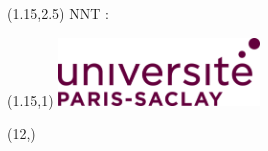 \label{cotutelle}






\begin{textblock}{13}(1.15,2.5)
  NNT : \NNT
\end{textblock}


\begin{textblock}{1}(1.15,1)
\includegraphics[height=1.8cm]{Figures/Logos/UPSac.png} %
\label{Logo Paris Saclay}
\end{textblock}

\begin{textblock}{1}(12,\vpos)
\logoEt %
\label{Logo Etablissement}
\end{textblock}


